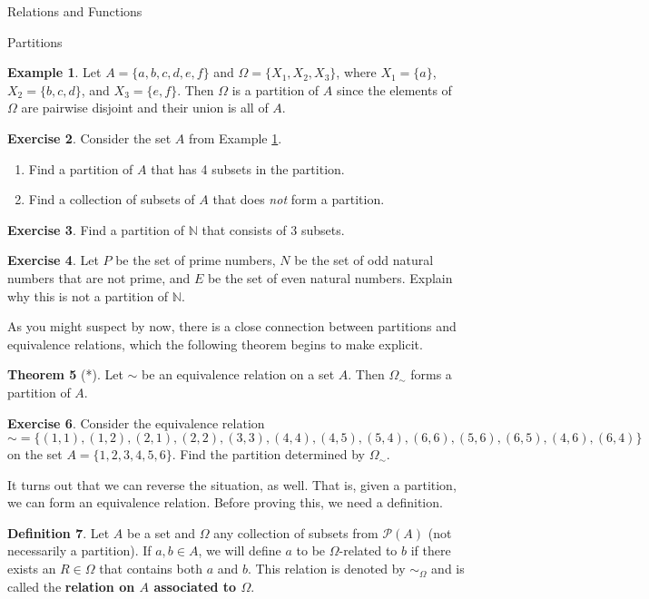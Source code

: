 \documentclass[11pt]{article}
\theoremstyle{definition}
\newtheorem{theorem}{Theorem}[section]
\newtheorem{definition}[theorem]{Definition}
\newtheorem{example}[theorem]{Example}
\newtheorem{exercise}[theorem]{Exercise}
\begin{document}
\begin{section}{Relations and Functions}
\begin{subsection}{Partitions}
\begin{example}\label{ex:a partition}
Let $A=\{a,b,c,d,e,f\}$ and $\Omega=\{X_{1},X_{2},X_{3}\}$, where $X_{1}=\{a\}$, $X_{2}=\{b,c,d\}$, and $X_{3}=\{e,f\}$.  Then $\Omega$ is a partition of $A$ since the elements of $\Omega$ are pairwise disjoint and their union is all of $A$.
\end{example}

\begin{exercise}
Consider the set $A$ from Example \ref{ex:a partition}.
\begin{enumerate}
\item Find a partition of $A$ that has 4 subsets in the partition.
\item Find a collection of subsets of $A$ that does \emph{not} form a partition.
\end{enumerate}
\end{exercise}

\begin{exercise}
Find a partition of $\mathbb{N}$ that consists of 3 subsets.
\end{exercise}

\begin{exercise}
Let $P$ be the set of prime numbers, $N$ be the set of odd natural numbers that are not prime, and $E$ be the set of even natural numbers.  Explain why this is not a partition of $\mathbb{N}$.
\end{exercise}

As you might suspect by now, there is a close connection between partitions and equivalence relations, which the following theorem begins to make explicit.

\begin{theorem}[*]
Let $\sim$ be an equivalence relation on a set $A$.  Then $\Omega_{\sim}$ forms a partition of $A$.
\end{theorem}

\begin{exercise}
Consider the equivalence relation
\[
\sim=\{(1,1),(1,2),(2,1), (2,2),(3,3),(4,4),(4,5),(5,4),(6,6),(5,6),(6,5),(4,6),(6,4)\}
\]
on the set $A=\{1,2,3,4,5,6\}$.  Find the partition determined by $\Omega_{\sim}$.
\end{exercise}

It turns out that we can reverse the situation, as well.  That is, given a partition, we can form an equivalence relation.  Before proving this, we need a definition.

\begin{definition}
Let $A$ be a set and $\Omega$ any collection of subsets from $\mathcal{P}(A)$ (not necessarily a partition).  If $a,b\in A$, we will define $a$ to be $\Omega$-related to $b$ if there exists an $R\in \Omega$ that contains both $a$ and $b$.  This relation is denoted by $\sim_{\Omega}$ and is called the \textbf{relation on $A$ associated to $\Omega$}.
\end{definition}


\end{subsection}
\end{section}
\end{document}
